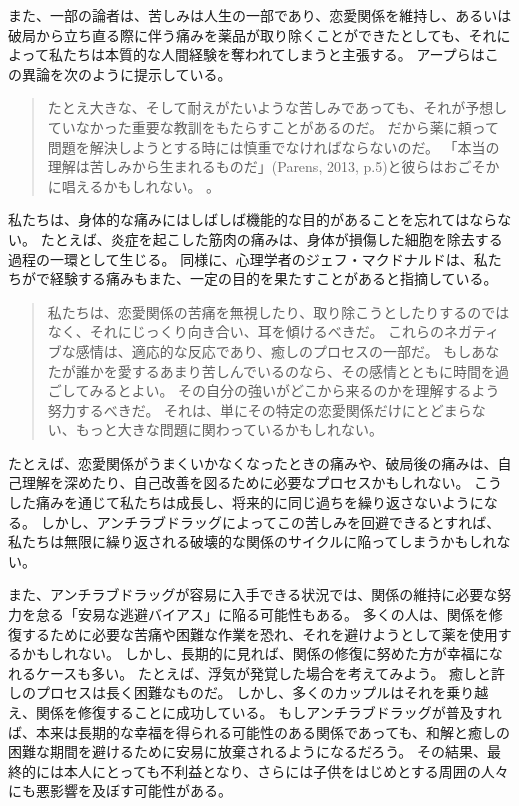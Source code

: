 \documentclass[paper=a4,book,openany]{jlreq} \usepackage{mystyle}
\begin{document}
また、一部の論者は、苦しみは人生の一部であり、恋愛関係を維持し、あるいは破局から立ち直る際に伴う痛みを薬品が取り除くことができたとしても、それによって私たちは本質的な人間経験を奪われてしまうと主張する。
アープらはこの異論を次のように提示している。

\begin{quote}
たとえ大きな、そして耐えがたいような苦しみであっても、それが予想していなかった重要な教訓をもたらすことがあるのだ。
だから薬に頼って問題を解決しようとする時には慎重でなければならないのだ。
「本当の理解は苦しみから生まれるものだ」(Parens, 2013, p.5)と彼らはおごそかに唱えるかもしれない。
\citep[p.12]{earp13:_if_i_could_just_stop_lovin_you}\nocite{parens13:_good_bad_forms_medic}。
\end{quote}

私たちは、身体的な痛みにはしばしば機能的な目的があることを忘れてはならない。
たとえば、炎症を起こした筋肉の痛みは、身体が損傷した細胞を除去する過程の一環として生じる。
同様に、心理学者のジェフ・マクドナルドは、私たちがで経験する痛みもまた、一定の目的を果たすことがあると指摘している。

\begin{quote}
私たちは、恋愛関係の苦痛を無視したり、取り除こうとしたりするのではなく、それにじっくり向き合い、耳を傾けるべきだ。
これらのネガティブな感情は、適応的な反応であり、癒しのプロセスの一部だ。
もしあなたが誰かを愛するあまり苦しんでいるのなら、その感情とともに時間を過ごしてみるとよい。
その自分の強いがどこから来るのかを理解するよう努力するべきだ。
それは、単にその特定の恋愛関係だけにとどまらない、もっと大きな問題に関わっているかもしれない。
\citep{lawson17:_why_does_love_hurt_so_much}
\end{quote}

たとえば、恋愛関係がうまくいかなくなったときの痛みや、破局後の痛みは、自己理解を深めたり、自己改善を図るために必要なプロセスかもしれない。
こうした痛みを通じて私たちは成長し、将来的に同じ過ちを繰り返さないようになる。
しかし、アンチラブドラッグによってこの苦しみを回避できるとすれば、私たちは無限に繰り返される破壊的な関係のサイクルに陥ってしまうかもしれない。

また、アンチラブドラッグが容易に入手できる状況では、関係の維持に必要な努力を怠る「安易な逃避バイアス」に陥る可能性もある。
多くの人は、関係を修復するために必要な苦痛や困難な作業を恐れ、それを避けようとして薬を使用するかもしれない。
しかし、長期的に見れば、関係の修復に努めた方が幸福になれるケースも多い。
たとえば、浮気が発覚した場合を考えてみよう。
癒しと許しのプロセスは長く困難なものだ。
しかし、多くのカップルはそれを乗り越え、関係を修復することに成功している。
もしアンチラブドラッグが普及すれば、本来は長期的な幸福を得られる可能性のある関係であっても、和解と癒しの困難な期間を避けるために安易に放棄されるようになるだろう。
その結果、最終的には本人にとっても不利益となり、さらには子供をはじめとする周囲の人々にも悪影響を及ぼす可能性がある。
\end{document}
